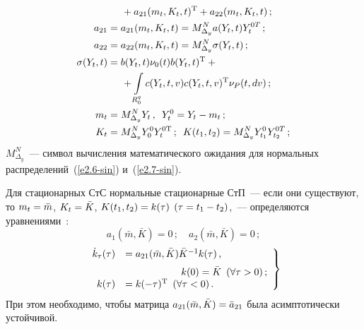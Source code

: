 \begin{multicols}{2}
\begin{align}
&\hspace*{5mm}{}+ a_{21} (m_t, K_t, t)^{\mathrm{T}} +
a_{22}(m_t, K_t, t)\,;\label{e2.12-sin}\\
a_{21} &= a_{21}(m_t, K_t, t)=  M_{\Delta_y}^N a(Y_t, t) Y_{t}^{0T}\,;\label{e2.13-sin}\\
a_{22} &= a_{22}(m_t, K_t, t)= M_{\Delta_y}^N \sigma (Y_t, t)\,;\label{e2.14-sin}
\\
\sigma (Y_t, t) &= b(Y_t, t) \nu_0(t) b(Y_t, t)^{\mathrm{T}} +{}\notag\\
&\hspace*{5mm}{}+\int\limits\limits_{R_0^q}
c (Y_t, t, v) c(Y_t, t,v)^{\mathrm{T}} \nu_P (t, dv)\,;\label{e2.15-sin}
\\
m_t &= M_{\Delta_y}^N Y_t\,,\enskip
Y_t^0 = Y_t - m_t\,;\notag\\
K_t &= M_{\Delta_y}^N Y_0^0 Y_t^{0\mathrm{T}}\,;\enskip
K(t_1, t_2) = M_{\Delta_y}^N Y_{t_1}^{0} Y_{t_2}^{0T}\,;\notag
\end{align}
$M_{\Delta_y}^N$~--- символ вычисления математического ожидания для
нормальных распределений~(\ref{e2.6-sin}) и~(\ref{e2.7-sin}).

Для стационарных СтС нормальные стационарные СтП~--- если они
существуют, то  $m_t\hm =\bar m$, $ K_t\hm =\bar K$, $K(t_1, t_2) \hm=
k(\tau)$ $(\tau \hm= t_1-t_2)$,~--- определяются уравнениями~\cite{2-sin, 3-sin}:
\begin{equation}
a_1 (\bar m, \bar K) =0\,;\quad a_2 (\bar m, \bar K)=0\,;\label{e2.17-sin}
\end{equation}
\begin{equation}
\left.
\begin{array}{rl}
\dot k_\tau (\tau) &= a_{21} (\bar m, \bar K)\bar K^{-1} k(\tau)\,,\\[6pt]
&\hspace*{20mm}k(0) =\bar K \enskip (\forall \tau >0)\,; \\
k(\tau) &= k(-\tau)^{\mathrm{T}} \enskip (\forall\tau <0)\,.
\end{array}
\right\}
\label{e2.18-sin}
\end{equation}
При этом необходимо, чтобы матрица  $a_{21} (\bar m, \bar K)\hm=\bar a_{21}$
была асимптотически устойчивой.


\end{multicols}
